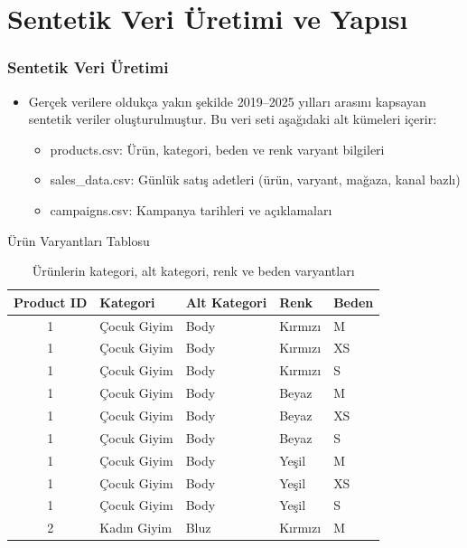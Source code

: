\documentclass[12pt]{beamer}
\begin{document}
	
	\section{Sentetik Veri Üretimi ve Yapısı}
	\begin{frame}
		\frametitle{Sentetik Veri Üretimi}
		\begin{itemize}
			\item Gerçek verilere oldukça yakın şekilde 2019–2025 yılları
			arasını kapsayan sentetik veriler oluşturulmuştur. Bu veri seti aşağıdaki alt
			kümeleri içerir:
			\begin{itemize}
				\item products.csv: Ürün, kategori, beden ve renk
				varyant bilgileri
				\item sales\_data.csv: Günlük satış adetleri (ürün,
				varyant, mağaza, kanal bazlı)
				\item campaigns.csv: Kampanya tarihleri ve açıklamaları
			\end{itemize}
			
		\end{itemize}
	\end{frame}
	
	\begin{frame}{\intersection Ürün Varyantları Tablosu}
		\scriptsize
		\begin{table}
			\centering
			\begin{tabular}{c l l l l}
				\toprule
				\textbf{Product ID} & \textbf{Kategori} & \textbf{Alt Kategori} & \textbf{Renk} & \textbf{Beden} \\
				\midrule
				1 & Çocuk Giyim & Body & Kırmızı & M \\
				1 & Çocuk Giyim & Body & Kırmızı & XS \\
				1 & Çocuk Giyim & Body & Kırmızı & S \\
				1 & Çocuk Giyim & Body & Beyaz   & M \\
				1 & Çocuk Giyim & Body & Beyaz   & XS \\
				1 & Çocuk Giyim & Body & Beyaz   & S \\
				1 & Çocuk Giyim & Body & Yeşil   & M \\
				1 & Çocuk Giyim & Body & Yeşil   & XS \\
				1 & Çocuk Giyim & Body & Yeşil   & S \\
				2 & Kadın Giyim & Bluz & Kırmızı & M \\
				\bottomrule
			\end{tabular}
			\caption{\small Ürünlerin kategori, alt kategori, renk ve beden varyantları}
		\end{table}
	\end{frame}
	
\end{document}
